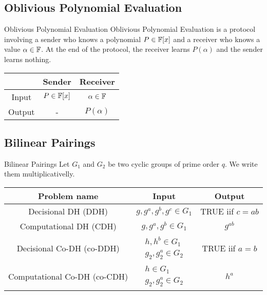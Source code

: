 \subsection{Oblivious Polynomial Evaluation}
\begin{frame}{Oblivious Polynomial Evaluation}
Oblivious Polynomial Evaluation is a protocol involving a sender who knows a polynomial $P \in {\mathbb F}[x]$ and a receiver who knows a value $\alpha \in {\mathbb F}$. At the end of the protocol, the receiver learns $P(\alpha)$ and the sender learns nothing.


\begin{center}
\begin{tabular}{|c|c|c|}
\hline
             &    Sender & Receiver \\ \hline
    Input    &    $P \in {\mathbb F}[x]$ & $\alpha \in {\mathbb F}$ \\ \hline
    Output   &    -    &    $P(\alpha)$ \\ \hline

\end{tabular}
\end{center}

\end{frame}

\subsection{Bilinear Pairings}
\begin{frame}{Bilinear Pairings}
Let $G_1$ and $G_2$ be two cyclic groups of prime order $q$. We write them multiplicativelly.
\begin{center}
\small
\begin{tabular}{|c|c|c|}
\hline
Problem name & Input & Output \\
\hline
Decisional DH (DDH) & $g,g^a,g^b,g^c \in G_1$ & TRUE iif $c=ab$ \\ \hline
Computational DH (CDH) & $g,g^a,g^b \in G_1$ &  $g^{ab}$  \\ \hline
Decisional Co-DH (co-DDH) & 
        $\begin{array}{r}
        h,h^b \in G_1 \\ 
        g_2, g_2^a \in G_2
        \end{array}$ & TRUE iif $a=b$ \\ \hline
Computational Co-DH (co-CDH) & 
        $\begin{array}{r}
        h \in G_1 \\
        g_2, g_2^a \in G_2
        \end{array}$ & $h^a$ \\ \hline

\end{tabular}
\end{center}
\end{frame}

